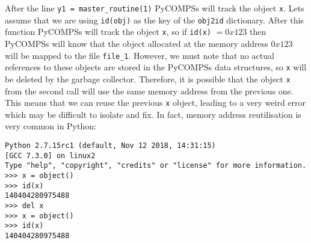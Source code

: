 \inputminted{python}{snippets/id_breaks.py}

After the line \verb|y1 = master_routine(1)| PyCOMPSs will track the object \verb|x|. Lets assume that we are using \verb|id(obj)| as the key of the \verb|obj2id| dictionary. After this function PyCOMPSs will track the object \verb|x|, so if \verb|id(x)| $ = 0x123$ then PyCOMPSs will know that the object allocated at the memory address $0x123$ will be mapped to the file \verb|file_1|. However, we must note that no actual references to these objects are stored in the PyCOMPSs data structures, so \verb|x| will be deleted by the garbage collector. Therefore, it is possible that the object \verb|x| from the second call will use the same memory address from the previous one. This means that we can reuse the previous \verb|x| object, leading to a very weird error which may be difficult to isolate and fix. In fact, memory address reutilisation is very common in Python:

\begin{verbatim}
Python 2.7.15rc1 (default, Nov 12 2018, 14:31:15) 
[GCC 7.3.0] on linux2
Type "help", "copyright", "credits" or "license" for more information.
>>> x = object()
>>> id(x)
140404280975488
>>> del x
>>> x = object()
>>> id(x)
140404280975488
\end{verbatim}



